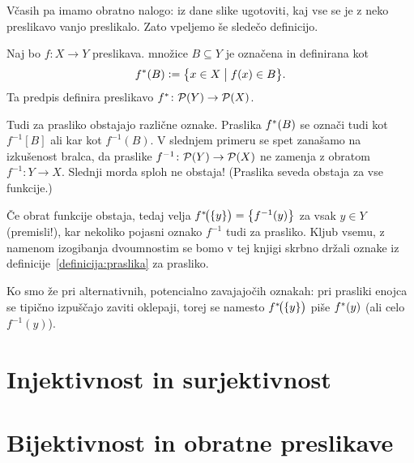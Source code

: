
Včasih pa imamo obratno nalogo: iz dane slike ugotoviti, kaj vse se je z neko preslikavo vanjo preslikalo. Zato vpeljemo še sledečo definicijo.

\begin{definicija}\label{definicija:praslika}
Naj bo $f\colon X \to Y$ preslikava.  množice $B \subseteq Y$ je označena in definirana kot
\[\pim{f}{B} \dfeq \set[1]{x \in X}{f(x) \in B}.\]
Ta predpis definira preslikavo $\pim{f}\colon \pst(Y) \to \pst(X)$.
\end{definicija}

\begin{opomba}
Tudi za prasliko obstajajo različne oznake. Praslika $\pim{f}{B}$ se označi tudi kot $f^{-1}[B]$ ali kar kot $f^{-1}(B)$. V slednjem primeru se spet zanašamo na izkušenost bralca, da praslike $f^{-1}\colon \mathcal{P}(Y) \to \mathcal{P}(X)$ ne zamenja z obratom $f^{-1}\colon Y \to X$. Slednji morda sploh ne obstaja! (Praslika seveda obstaja za vse funkcije.)

Če obrat funkcije obstaja, tedaj velja $\pim[1]{f}{\set{y}} = \set[1]{f^{-1}(y)}$ za vsak $y \in Y$ (premisli!), kar nekoliko pojasni oznako $f^{-1}$ tudi za prasliko. Kljub vsemu, z namenom izogibanja dvoumnostim se bomo v tej knjigi skrbno držali oznake iz definicije~\ref{definicija:praslika} za prasliko.

Ko smo že pri alternativnih, potencialno zavajajočih oznakah: pri prasliki enojca se tipično izpuščajo zaviti oklepaji, torej se namesto $\pim[1]{f}{\set{y}}$ piše $\pim{f}{y}$ (ali celo $f^{-1}(y)$).
\end{opomba}




\section{Injektivnost in surjektivnost}\label{razdelek:injektivnost-in-surjektivnost}



\section{Bijektivnost in obratne preslikave}\label{razdelek:bijektivnost-in-obratne-preslikave}

